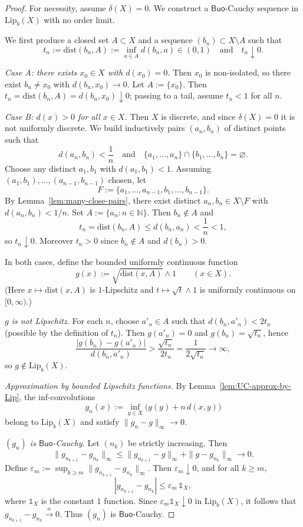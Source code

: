 \documentclass[11pt]{amsart}
\theoremstyle{definition}
\newcommand{\N}{\mathbb{N}}
\newcommand{\Buo}{\ensuremath{\mathsf{Buo}}}
\renewcommand{\le}{\leqslant}
\renewcommand{\ge}{\geqslant}
\begin{document}
\begin{proof}
\noindent For necessity, assume $\delta(X)=0$. We construct a \Buo-Cauchy sequence in
$\mathrm{Lip}_b(X)$ with no order limit.

\smallskip\noindent
We first produce a closed set $A\subset X$ and a sequence $(b_n)\subset X\setminus A$ such that
\[
t_n:=\mathrm{dist}(b_n,A):=\inf_{a\in A}d(b_n,a)\in(0,1)\quad\text{and}\quad t_n\downarrow0.
\]

\smallskip
\emph{Case A: there exists $x_0\in X$ with $d(x_0)=0$.}
Then $x_0$ is non-isolated, so there exist $b_n\neq x_0$ with $d(b_n,x_0)\to0$.
Let $A:=\{x_0\}$. Then $t_n=\mathrm{dist}(b_n,A)=d(b_n,x_0)\downarrow0$; passing to a tail, assume $t_n<1$ for all $n$.

\smallskip
\emph{Case B: $d(x)>0$ for all $x\in X$.}
Then $X$ is discrete, and since $\delta(X)=0$ it is not uniformly discrete.
We build inductively pairs $(a_n,b_n)$ of distinct points such that
\[
d(a_n,b_n)<\frac1n
\quad\text{and}\quad
\{a_1,\dots,a_n\}\cap\{b_1,\dots,b_n\}=\varnothing.
\]
Choose any distinct $a_1,b_1$ with $d(a_1,b_1)<1$.
Assuming $(a_1,b_1),\dots,(a_{n-1},b_{n-1})$ chosen, let
\[
F:=\{a_1,\dots,a_{n-1},b_1,\dots,b_{n-1}\}.
\]
By Lemma~\ref{lem:many-close-pairs}, there exist distinct $a_n,b_n\in X\setminus F$ with $d(a_n,b_n)<1/n$.
Set $A:=\{a_n:n\in\N\}$. Then $b_n\notin A$ and
\[
t_n=\mathrm{dist}(b_n,A)\le d(b_n,a_n)<\frac1n<1,
\]
so $t_n\downarrow0$. Moreover $t_n>0$ since $b_n\notin A$ and $d(b_n)>0$.

\smallskip\noindent
In both cases, define the bounded uniformly continuous function
\[
g(x):=\sqrt{\mathrm{dist}(x,A)}\wedge 1\qquad(x\in X).
\]
(Here $x\mapsto \mathrm{dist}(x,A)$ is $1$-Lipschitz and $t\mapsto \sqrt{t}\wedge 1$
is uniformly continuous on $[0,\infty)$.)

\smallskip\noindent
\emph{$g$ is not Lipschitz.}
For each $n$, choose $a'_n\in A$ such that $d(b_n,a'_n)<2t_n$ (possible by the definition of $t_n$).
Then $g(a'_n)=0$ and $g(b_n)=\sqrt{t_n}$, hence
\[
\frac{|g(b_n)-g(a'_n)|}{d(b_n,a'_n)}
>\frac{\sqrt{t_n}}{2t_n}
=\frac{1}{2\sqrt{t_n}}
\longrightarrow\infty,
\]
so $g\notin\mathrm{Lip}_b(X)$.

\smallskip\noindent
\emph{Approximation by bounded Lipschitz functions.}
By Lemma~\ref{lem:UC-approx-by-Lip}, the inf-convolutions
\[
g_n(x):=\inf_{y\in X}\bigl(g(y)+n\,d(x,y)\bigr)
\]
belong to $\mathrm{Lip}_b(X)$ and satisfy $\|g_n-g\|_\infty\to0$.

\smallskip\noindent
\emph{$(g_n)$ is \Buo-Cauchy.}
Let $(n_k)$ be strictly increasing. Then
\[
\|g_{n_{k+1}}-g_{n_k}\|_\infty
\le \|g_{n_{k+1}}-g\|_\infty+\|g-g_{n_k}\|_\infty
\longrightarrow0.
\]
Define $\varepsilon_m:=\sup_{k\ge m}\|g_{n_{k+1}}-g_{n_k}\|_\infty$. Then $\varepsilon_m\downarrow0$, and for all $k\ge m$,
\[
|g_{n_{k+1}}-g_{n_k}|\le \varepsilon_m\,\mathds1_X,
\]
where $\mathds1_X$ is the constant $1$ function. Since $\varepsilon_m\mathds1_X\downarrow0$ in $\mathrm{Lip}_b(X)$,
it follows that $g_{n_{k+1}}-g_{n_k}\xrightarrow{\mathrm{o}}0$.
Thus $(g_n)$ is \Buo-Cauchy.


\end{proof}
\end{document}
